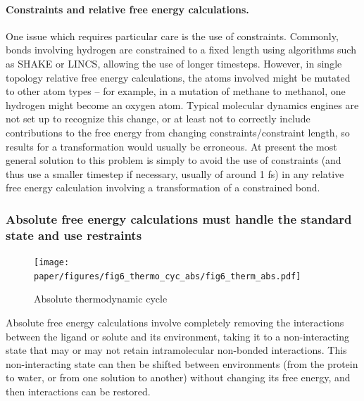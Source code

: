 \documentclass[9pt,bestpractices]{livecoms}
\begin{document}
\paragraph{Constraints and relative free energy calculations.}
One issue which requires particular care is the use of constraints.
Commonly, bonds involving hydrogen are constrained to a fixed length using algorithms such as SHAKE or LINCS, allowing the use of longer timesteps.
However, in single topology relative free energy calculations, the atoms involved might be mutated to other atom types -- for example, in a mutation of methane to methanol, one hydrogen might become an oxygen atom.
Typical molecular dynamics engines are not set up to recognize this change, or at least not to correctly include contributions to the free energy from changing constraints/constraint length, so results for a transformation would usually be erroneous.
At present the most general solution to this problem is simply to avoid the use of constraints (and thus use a smaller timestep if necessary, usually of around 1 fs) in any relative free energy calculation involving a transformation of a constrained bond.

\subsubsection*{Absolute free energy calculations must handle the standard state and use restraints}
\label{sec:standardstate-restraints}



\begin{figure}
    \texttt{[image: paper/figures/fig6\_thermo\_cyc\_abs/fig6\_therm\_abs.pdf]}
    \caption{Absolute thermodynamic cycle}
    \label{fig:fig6_absolute-thermodynamic-cycle}
\end{figure}

Absolute free energy calculations involve completely removing the interactions between the ligand or solute and its environment, taking it to a non-interacting state that may or may not retain intramolecular non-bonded interactions.
This non-interacting state can then be shifted between environments (from the protein to water, or from one solution to another) without changing its free energy, and then interactions can be restored.
\end{document}
